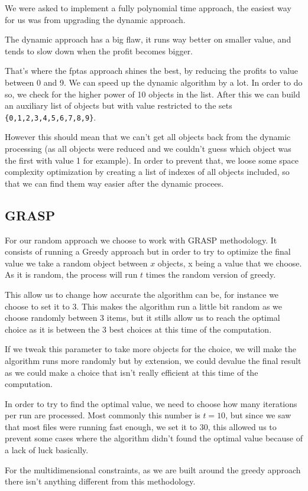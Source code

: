 \documentclass[a4paper, 11pt]{article}
\begin{document}
    We were asked to implement a fully polynomial time approach, the easiest way for us was from upgrading the dynamic approach.\par
    The dynamic approach has a big flaw, it runs way better on smaller value, and tends to slow down when the profit becomes bigger.\par
    That's where the fptas approach shines the best, by reducing the profits to value between 0 and 9. We can speed up the dynamic algorithm by a lot. In order to do so, we check for the higher power of 10 objects in the list. After this we can build an auxiliary list of objects but with value restricted to the sets \verb+{0,1,2,3,4,5,6,7,8,9}+.\par 
    However this should mean that we can't get all objects back from the dynamic processing (as all objects were reduced and we couldn't guess which object was the first with value 1 for example). In order to prevent that, we loose some space complexity optimization by creating a list of indexes of all objects included, so that we can find them way easier after the dynamic procees.


    \subsection{GRASP}

    For our random approach we choose to work with GRASP methodology. It consists of running a Greedy approach but in order to try to optimize the final value we take a random object between $x$ objects, x being a value that we choose. As it is random, the process will run $t$ times the random version of greedy.\par
    This allow us to change how accurate the algorithm can be, for instance we choose to set it to 3. This makes the algorithm run a little bit random as we choose randomly between 3 items, but it stills allow us to reach the optimal choice as it is between the 3 best choices at this time of the computation.\par
    If we tweak this parameter to take more objects for the choice, we will make the algorithm runs more randomly but by extension, we could devalue the final result as we could make a choice that isn't really efficient at this time of the computation.\par
    In order to try to find the optimal value, we need to choose how many iterations per run are processed. Most commonly this number is $t = 10$, but since we saw that most files were running fast enough, we set it to 30, this allowed us to prevent some cases where the algorithm didn't found the optimal value because of a lack of luck basically.\par
    For the multidimensional constraints, as we are built around the greedy approach there isn't anything different from this methodology.
\end{document}
